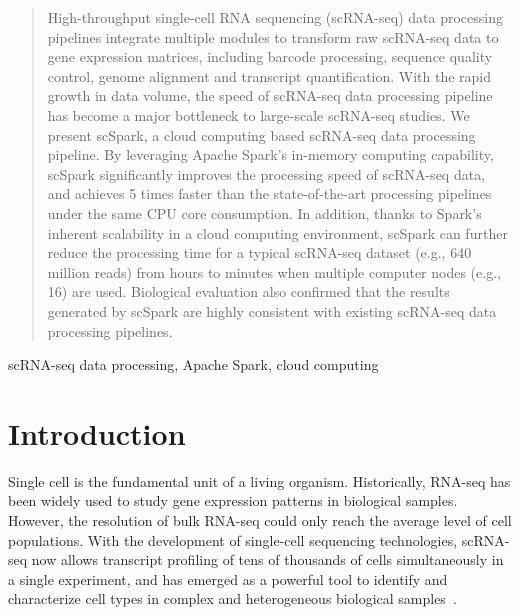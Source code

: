 \documentclass[conference]{IEEEtran}
\begin{document}
\begin{abstract}

High-throughput single-cell RNA sequencing (scRNA-seq) data processing pipelines integrate multiple modules to transform raw scRNA-seq data to gene expression matrices, including barcode processing, sequence quality control, genome alignment and transcript quantification.
With the rapid growth in data volume, the speed of scRNA-seq data processing pipeline has become a major bottleneck to large-scale scRNA-seq studies. 
We present scSpark, a cloud computing based scRNA-seq data processing pipeline. 
By leveraging Apache Spark's in-memory computing capability, scSpark significantly improves the processing speed of scRNA-seq data, and achieves 5 times faster than the state-of-the-art processing pipelines under the same CPU core consumption.
In addition, thanks to Spark's inherent scalability in a cloud computing environment, scSpark can further reduce the processing time for a typical scRNA-seq dataset (e.g., 640 million reads) from hours to minutes when multiple computer nodes (e.g., 16) are used.  
Biological evaluation also confirmed that the results generated by scSpark are highly consistent with existing scRNA-seq data processing pipelines.
\end{abstract}

\begin{IEEEkeywords}
scRNA-seq data processing, Apache Spark, cloud computing
\end{IEEEkeywords}

\section{Introduction}
Single cell is the fundamental unit of a living organism.
Historically, RNA-seq has been widely used to study gene expression patterns in biological samples.
However, the resolution of bulk RNA-seq could only reach the average level of cell populations. 
With the development of single-cell sequencing technologies, scRNA-seq now allows transcript profiling of tens of thousands of cells simultaneously in a single experiment, and has emerged as a powerful tool to identify and characterize cell types in complex and heterogeneous biological samples~\cite{Zhang2019ComparativeAO}.
\end{document}

